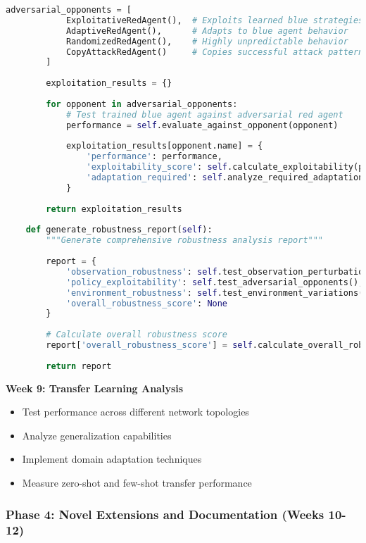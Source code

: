 \documentclass[12pt,a4paper]{article}
\begin{document}
\begin{lstlisting}[language=Python, caption=Adversarial Robustness Testing]
        adversarial_opponents = [
            ExploitativeRedAgent(),  # Exploits learned blue strategies
            AdaptiveRedAgent(),      # Adapts to blue agent behavior
            RandomizedRedAgent(),    # Highly unpredictable behavior
            CopyAttackRedAgent()     # Copies successful attack patterns
        ]
        
        exploitation_results = {}
        
        for opponent in adversarial_opponents:
            # Test trained blue agent against adversarial red agent
            performance = self.evaluate_against_opponent(opponent)
            
            exploitation_results[opponent.name] = {
                'performance': performance,
                'exploitability_score': self.calculate_exploitability(performance),
                'adaptation_required': self.analyze_required_adaptation(opponent, performance)
            }
        
        return exploitation_results
    
    def generate_robustness_report(self):
        """Generate comprehensive robustness analysis report"""
        
        report = {
            'observation_robustness': self.test_observation_perturbation(),
            'policy_exploitability': self.test_adversarial_opponents(),
            'environment_robustness': self.test_environment_variations(),
            'overall_robustness_score': None
        }
        
        # Calculate overall robustness score
        report['overall_robustness_score'] = self.calculate_overall_robustness(report)
        
        return report
\end{lstlisting}

\textbf{Week 9: Transfer Learning Analysis}
\begin{itemize}
    \item Test performance across different network topologies
    \item Analyze generalization capabilities
    \item Implement domain adaptation techniques
    \item Measure zero-shot and few-shot transfer performance
\end{itemize}

\subsubsection{Phase 4: Novel Extensions and Documentation (Weeks 10-12)}
\end{document}
